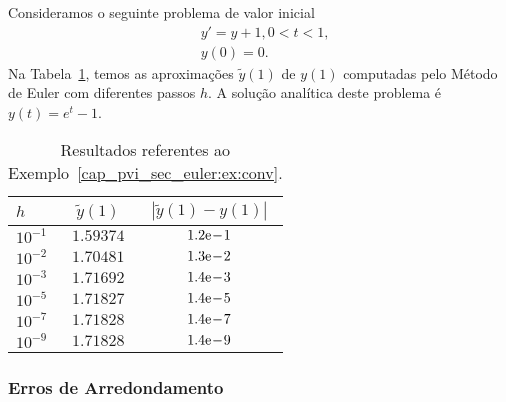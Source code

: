 \begin{ex}\label{cap_pvi_sec_euler:ex:conv}
  Consideramos o seguinte problema de valor inicial
  \begin{subequations}
    \begin{align}
      &y' = y + 1, 0 < t < 1,\\
      &y(0) = 0.
    \end{align}
\end{subequations}
  Na Tabela~\ref{cap_pvi_sec_euler:tab:euler_conv}, temos as aproximações $\tilde{y}(1)$ de $y(1)$ computadas pelo Método de Euler com diferentes passos $h$. A solução analítica deste problema é $y(t) = e^{t}-1$.
 
  \begin{table}[h!]
    \centering
    \caption{Resultados referentes ao Exemplo~\ref{cap_pvi_sec_euler:ex:conv}.}
    \begin{tabular}{l|cc}
      $h$ & $\tilde{y}(1)$ & $|\tilde{y}(1)-y(1)|$\\\hline
      $10^{-1}$ & $1.59374$ & $1.2\mathrm{e}\!-\!1$ \\
      $10^{-2}$ & $1.70481$ & $1.3\mathrm{e}\!-\!2$ \\
      $10^{-3}$ & $1.71692$ & $1.4\mathrm{e}\!-\!3$ \\
      $10^{-5}$ & $1.71827$ & $1.4\mathrm{e}\!-\!5$ \\
      $10^{-7}$ & $1.71828$ & $1.4\mathrm{e}\!-\!7$ \\
      $10^{-9}$ & $1.71828$ & $1.4\mathrm{e}\!-\!9$ \\\hline
    \end{tabular}
    \label{cap_pvi_sec_euler:tab:euler_conv}
  \end{table}
\end{ex}

\subsubsection{Erros de Arredondamento}

